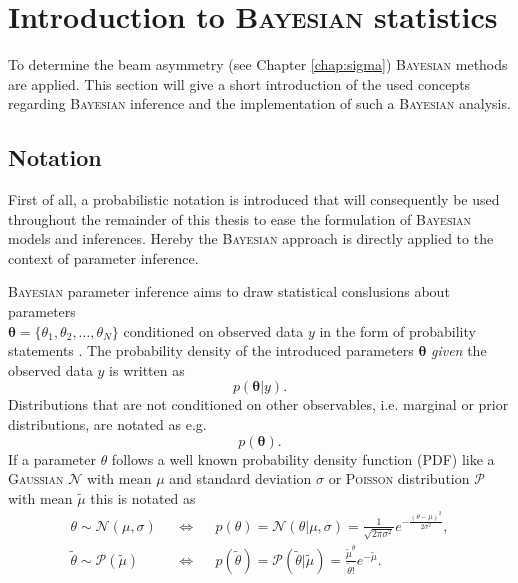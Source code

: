 \section{Introduction to \textsc{Bayesian} statistics}
\label{sec:bayes}
To determine the beam asymmetry (see Chapter \ref{chap:sigma}) \textsc{Bayesian} methods are applied. This section will give a short introduction of the used concepts regarding \textsc{Bayesian} inference and the implementation of such a \textsc{Bayesian} analysis.
\subsection{Notation}
 First of all, a probabilistic notation is introduced that will consequently be used throughout the remainder of this thesis to ease the formulation of \textsc{Bayesian} models and inferences. Hereby the \textsc{Bayesian} approach is directly applied to the context of parameter inference. 
 
 \noindent\textsc{Bayesian} parameter inference aims to draw statistical conslusions about parameters\\ $\boldsymbol{\theta}=\{\theta_1,\theta_2,\dots,\theta_N\}$ conditioned on observed data $y$ in the form of probability statements \cite{bayes}. The probability density of the introduced parameters $\boldsymbol{\theta}$ \emph{given} the observed data $y$ is written as 
 \begin{equation}
 	 p(\boldsymbol{\theta}|y).
 \end{equation}
Distributions that are not conditioned on other observables, i.e. marginal or prior distributions, are notated as e.g.
\begin{equation}
	p(\boldsymbol{\theta}).
\end{equation}
If a parameter $\theta$ follows a well known probability density function (PDF) like a \textsc{Gaussian} $\mathcal{N}$ with mean $\mu$ and standard deviation $\sigma$ or \textsc{Poisson} distribution $\mathcal{P}$ with mean $\tilde{\mu}$ this is notated as
\begin{align}
	\theta\sim\mathcal{N}(\mu,\sigma) &&\Leftrightarrow&& p(\theta)=\mathcal{N}(\theta|\mu,\sigma)=\frac{1}{\sqrt{2\pi\sigma^2}}e^{-\frac{(\theta-\mu)^2}{2\sigma^2}},\\
	\tilde{\theta}\sim\mathcal{P}(\tilde{\mu})&&\Leftrightarrow&&p(\tilde{\theta})=\mathcal{P}(\tilde{\theta}|\tilde{\mu})=\frac{\tilde{\mu}^\theta}{\tilde{\theta}!}e^{-\tilde{\mu}}.
\end{align}
